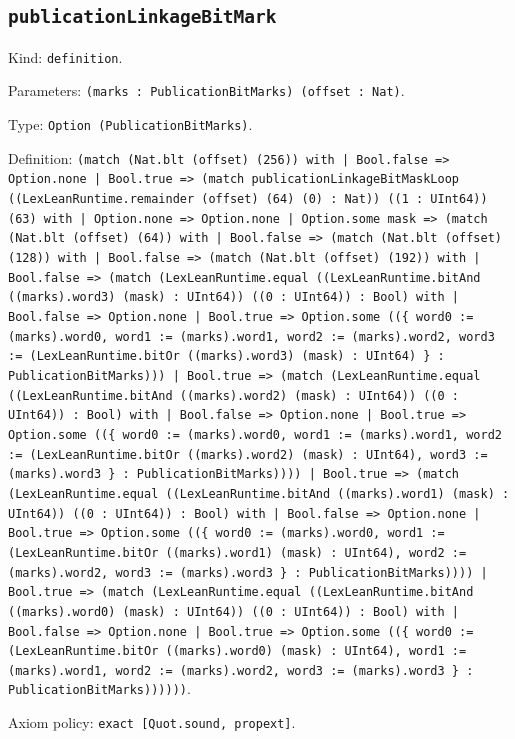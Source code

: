 \documentclass[11pt]{article}
\begin{document}
\subsection*{\texttt{publicationLinkageBitMark}}
\noindent Kind: \texttt{definition}.\par
\noindent Parameters: \texttt{(marks : PublicationBitMarks) (offset : Nat)}.\par
\noindent Type: \texttt{Option (PublicationBitMarks)}.\par
\noindent Definition: \texttt{(match (Nat.blt (offset) (256)) with | Bool.false => Option.none | Bool.true => (match publicationLinkageBitMaskLoop ((LexLeanRuntime.remainder (offset) (64) (0) : Nat)) ((1 : UInt64)) (63) with | Option.none => Option.none | Option.some mask => (match (Nat.blt (offset) (64)) with | Bool.false => (match (Nat.blt (offset) (128)) with | Bool.false => (match (Nat.blt (offset) (192)) with | Bool.false => (match (LexLeanRuntime.equal ((LexLeanRuntime.bitAnd ((marks).word3) (mask) : UInt64)) ((0 : UInt64)) : Bool) with | Bool.false => Option.none | Bool.true => Option.some ((\{ word0 := (marks).word0, word1 := (marks).word1, word2 := (marks).word2, word3 := (LexLeanRuntime.bitOr ((marks).word3) (mask) : UInt64) \} : PublicationBitMarks))) | Bool.true => (match (LexLeanRuntime.equal ((LexLeanRuntime.bitAnd ((marks).word2) (mask) : UInt64)) ((0 : UInt64)) : Bool) with | Bool.false => Option.none | Bool.true => Option.some ((\{ word0 := (marks).word0, word1 := (marks).word1, word2 := (LexLeanRuntime.bitOr ((marks).word2) (mask) : UInt64), word3 := (marks).word3 \} : PublicationBitMarks)))) | Bool.true => (match (LexLeanRuntime.equal ((LexLeanRuntime.bitAnd ((marks).word1) (mask) : UInt64)) ((0 : UInt64)) : Bool) with | Bool.false => Option.none | Bool.true => Option.some ((\{ word0 := (marks).word0, word1 := (LexLeanRuntime.bitOr ((marks).word1) (mask) : UInt64), word2 := (marks).word2, word3 := (marks).word3 \} : PublicationBitMarks)))) | Bool.true => (match (LexLeanRuntime.equal ((LexLeanRuntime.bitAnd ((marks).word0) (mask) : UInt64)) ((0 : UInt64)) : Bool) with | Bool.false => Option.none | Bool.true => Option.some ((\{ word0 := (LexLeanRuntime.bitOr ((marks).word0) (mask) : UInt64), word1 := (marks).word1, word2 := (marks).word2, word3 := (marks).word3 \} : PublicationBitMarks))))))}.\par
\noindent Axiom policy: \texttt{exact [Quot.sound, propext]}.\par
\end{document}
